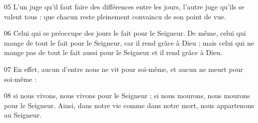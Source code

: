 
05 L’un juge qu’il faut faire des différences entre les jours, l’autre juge qu’ils se valent tous : que chacun reste pleinement convaincu de son point de vue.

06 Celui qui se préoccupe des jours le fait pour le Seigneur. De même, celui qui mange de tout le fait pour le Seigneur, car il rend grâce à Dieu ; mais celui qui ne mange pas de tout le fait aussi pour le Seigneur et il rend grâce à Dieu.

07 En effet, aucun d’entre nous ne vit pour soi-même, et aucun ne meurt pour soi-même :

08 si nous vivons, nous vivons pour le Seigneur ; si nous mourons, nous mourons pour le Seigneur. Ainsi, dans notre vie comme dans notre mort, nous appartenons au Seigneur.
